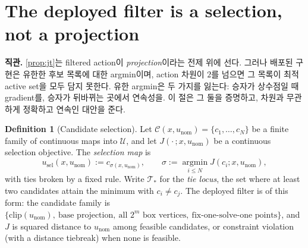 \documentclass[11pt]{article}
\theoremstyle{plain}
\theoremstyle{definition}
\newtheorem{definition}[theorem]{Definition}
\theoremstyle{remark}
\newcommand{\calU}{\mathcal{U}}
\newcommand{\calT}{\mathcal{T}}
\newcommand{\eqdef}{:=}
\begin{document}
\section{The deployed filter is a selection, not a projection}\label{sec:selection}

\textbf{직관.} \cref{prop:jt}는 filtered action이 \emph{projection}이라는 전제 위에 선다. 그러나
배포된 구현은 유한한 후보 목록에 대한 argmin이며, action 차원이 $2$를 넘으면 그 목록이 최적 active
set을 모두 담지 못한다. 유한 argmin은 두 가지를 잃는다: 승자가 상수점일 때 gradient를, 승자가
뒤바뀌는 곳에서 연속성을. 이 절은 그 둘을 증명하고, 차원과 무관하게 정확하고 연속인 대안을 준다.

\begin{definition}[Candidate selection]\label{def:sel}
Let $\mathcal C(x,u_{\mathrm{nom}})=\{c_1,\dots,c_N\}$ be a finite family of continuous maps into
$\calU$, and let $J(\cdot\,;x,u_{\mathrm{nom}})$ be a continuous selection objective. The
\emph{selection map} is
\begin{equation}
u_{\mathrm{sel}}(x,u_{\mathrm{nom}})\eqdef c_{\sigma(x,u_{\mathrm{nom}})},
\qquad
\sigma\eqdef\operatorname*{argmin}_{i\le N} J(c_i;x,u_{\mathrm{nom}}),
\end{equation}
with ties broken by a fixed rule. Write $\calT_\ast$ for the \emph{tie locus}, the set where at
least two candidates attain the minimum with $c_i\neq c_j$. The deployed filter is of this form:
the candidate family is $\{\mathrm{clip}(u_{\mathrm{nom}}),\ \text{base projection},\
\text{all }2^m\text{ box vertices},\ \text{fix-one-solve-one points}\}$, and $J$ is squared
distance to $u_{\mathrm{nom}}$ among feasible candidates, or constraint violation (with a
distance tiebreak) when none is feasible.
\end{definition}
\end{document}
